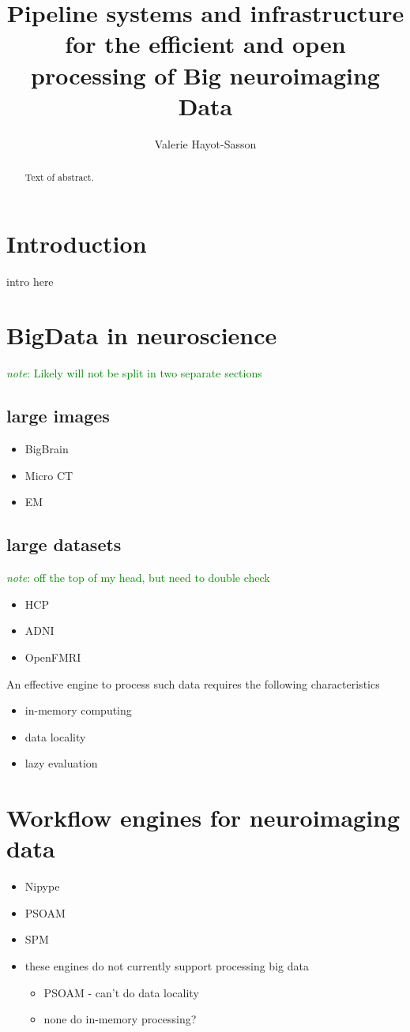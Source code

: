 \documentclass{report}
\newcommand{\note}[1]{\textcolor{green}{\textit{note}: #1}}
\begin{document}
\title{Pipeline systems and infrastructure for the efficient and open processing of Big neuroimaging Data}
\author{Valerie Hayot-Sasson}
\maketitle
\begin{abstract}
  Text of abstract.  
\end{abstract}
\tableofcontents
\chapter{Introduction}
intro here
\chapter{BigData in neuroscience}
    \note{Likely will not be split in two separate sections}
    \section{large images}
        \begin{itemize}  
            \item BigBrain
            \item Micro CT 
            \item EM 
        \end{itemize}
    \section{large datasets}
    	\note{off the top of my head, but need to double check}
        \begin{itemize}
            \item HCP
            \item ADNI
            \item OpenFMRI
        \end{itemize}
    An effective engine to process such data requires the following characteristics
        \begin{itemize}
            \item in-memory computing
            \item data locality
            \item lazy evaluation
        \end{itemize}
\chapter{Workflow engines for neuroimaging data}
    \begin{itemize}
        \item Nipype
        \item PSOAM
        \item SPM
        \item these engines do not currently support processing big data
      	\begin{itemize}
        		\item PSOAM - can't do data locality
		\item none do in-memory processing?
	\end{itemize}
    \end{itemize}
\end{document}
